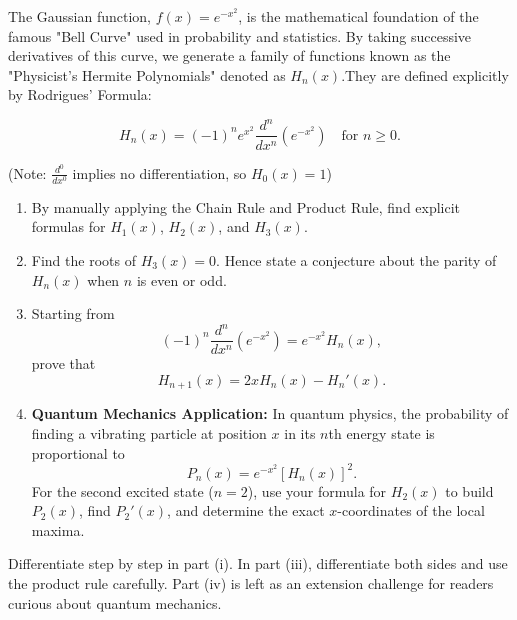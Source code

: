 \begin{problem}



The Gaussian function, $f(x) = e^{-x^2}$, is the mathematical foundation of the famous "Bell Curve" used in probability and statistics. By taking successive derivatives of this curve, we generate a family of functions known as the "Physicist's Hermite Polynomials" denoted as $H_n(x)$.They are defined explicitly by Rodrigues' Formula:

\[ H_n(x) = (-1)^n e^{x^2} \frac{d^n}{dx^n} \left( e^{-x^2} \right) \quad \text{for } n \ge 0. \]

(Note: $\frac{d^0}{dx^0}$ implies no differentiation, so $H_0(x) = 1$)


\begin{enumerate}[label=(\roman*)]
\item By manually applying the Chain Rule and Product Rule, find explicit formulas for $H_1(x)$, $H_2(x)$, and $H_3(x)$.

\item Find the roots of $H_3(x)=0$. Hence state a conjecture about the parity of $H_n(x)$ when $n$ is even or odd.

\item Starting from
\[
(-1)^n\frac{d^n}{dx^n}\left(e^{-x^2}\right)=e^{-x^2}H_n(x),
\]
prove that
\[
H_{n+1}(x)=2xH_n(x)-H_n'(x).
\]
\item \textbf{Quantum Mechanics Application:} In quantum physics, the probability of finding a vibrating particle at position $x$ in its $n$th energy state is proportional to
\[
P_n(x)=e^{-x^2}[H_n(x)]^2.
\]
For the second excited state ($n=2$), use your formula for $H_2(x)$ to build $P_2(x)$, find $P_2'(x)$, and determine the exact $x$-coordinates of the local maxima.
\end{enumerate}
\end{problem}

\begin{hintbox}
Differentiate step by step in part (i). In part (iii), differentiate both sides and use the product rule carefully. Part (iv) is left as an extension challenge for readers curious about quantum mechanics.
\end{hintbox}

